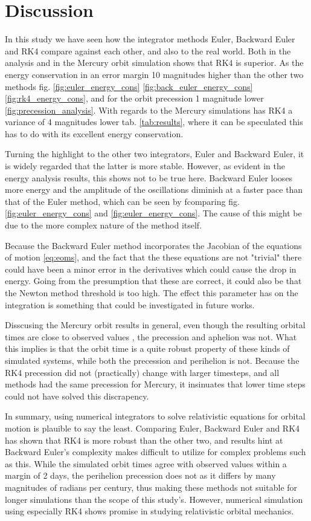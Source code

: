 \section{Discussion}\label{sec:disscussion}

In this study we have seen how the integrator methods Euler, Backward Euler and RK4 compare against each other, and also to the real world. Both in the analysis and in the Mercury orbit simulation shows that RK4 is superior. As the energy conservation in an error margin 10 magnitudes higher than the other two methods fig. \ref{fig:euler_energy_cons} \ref{fig:back_euler_energy_cons} \ref{fig:rk4_energy_cons}, and for the orbit precession 1 magnitude lower \ref{fig:precession_analysis}. With regards to the Mercury simulations has RK4 a variance of 4 magnitudes lower tab. \ref{tab:results}, where it can be speculated this has to do with its excellent energy conservation. 

Turning the highlight to the other two integrators, Euler and Backward Euler, it is widely regarded that the latter is more stable. However, as evident in the energy analysis results, this shows not to be true here. Backward Euler looses more energy and the amplitude of the oscillations diminish at a faster pace than that of the Euler method, which can be seen by fcomparing fig. \ref{fig:euler_energy_cons} and \ref{fig:euler_energy_cons}. The cause of this might be due to the more complex nature of the method itself. 

Because the Backward Euler method incorporates the Jacobian of the equations of motion \eqref{eq:eoms}, and the fact that the these equations are not "trivial" there could have been a minor error in the derivatives which could cause the drop in energy. Going from the presumption that these are correct, it could also be that the Newton method threshold is too high. The effect this parameter has on the integration is something that could be investigated in future works. 

Disscusing the Mercury orbit results in general, even though the resulting orbital times are close to observed values \cite{nasa_mercury}, the precession and aphelion was not. What this implies is that the orbit time is a quite robust property of these kinds of simulated systems, while both the precession and perihelion is not. Because the RK4 precession did not (practically) change with larger timesteps, and all methods had the same precession for Mercury, it insinuates that lower time steps could not have solved this discrapency. 

In summary, using numerical integrators to solve relativistic equations for orbital motion is plauible to say the least. Comparing Euler, Backward Euler and RK4 has shown that RK4 is more robust than the other two, and results hint at Backward Euler's complexity makes difficult to utilize for complex problems such as this. While the simulated orbit times agree with observed values within a margin of 2 days, the perihelion precession does not as it differs by many magnitudes of radians per century, thus making these methods not suitable for longer simulations than the scope of this study's. However, numerical simulation using especially RK4 shows promise in studying relativistic orbital mechanics. 

